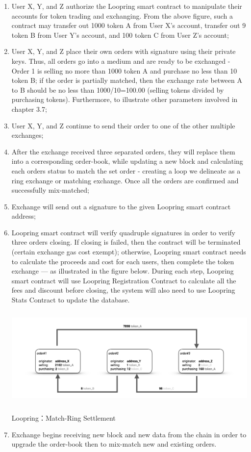 \documentclass[UTF8,nofonts]{article}
\makeatletter
\newenvironment{figurehere}
 {\def\@captype{figure}}
 {}
\makeatother
\begin{document}
\begin{enumerate}
 \item User X, Y, and Z authorize the Loopring smart contract to manipulate their accounts for token trading and exchanging. From the above figure, such a contract may transfer out 1000 token A from User X's account, transfer out 9 token B from User Y's account, and 100 token C from User Z's account;
 \item User X, Y, and Z place their own orders with signature using their private keys. Thus, all orders go into a medium and are ready to be exchanged - Order 1 is selling no more than 1000 token A and purchase no less than 10 token B; if the order is partially matched,  then the exchange rate between A to B should be no less than 1000/10=100.00 (selling tokens divided by purchasing tokens). Furthermore, to illustrate other parameters involved in chapter 3.7;
 \item User X, Y, and Z continue to send their order to one of the other multiple exchanges;
 \item After the exchange received three separated orders, they will replace them into a corresponding order-book, while updating a new block and calculating each orders status to match the set order - creating a loop we delineate as a ring exchange or matching exchange. Once all the orders are confirmed and successfully mix-matched;
 \item Exchange will send out a signature to the given Loopring smart contract address;
 \item Loopring smart contract will verify quadruple signatures in order to verify three orders closing. If closing is failed, then the contract will be terminated (certain exchange gas cost exempt); otherwise, Loopring smart contract needs to calculate the proceeds and cost for each users, then complete the token exchange --- as illustrated in the figure below. During each step, Loopring smart contract will use Loopring Registration Contract to calculate all the fees and discount before closing, the system will also need to use Loopring Stats Contract to update the database.

\begin{center}
\begin{figurehere}
\includegraphics[height=5cm]{images/en-Loopring-example.png}
\caption{Loopring：Match-Ring Settlement}
\label{fig:Loopringprotocol}
\end{figurehere}
\end{center}
  
  
 \item Exchange begins receiving new block and new data from the chain in order to upgrade the order-book then to mix-match new and existing orders.
\end{enumerate}
\end{document}
